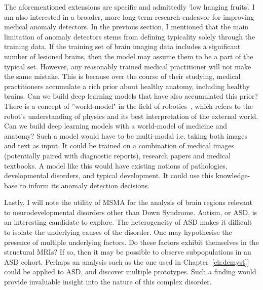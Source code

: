 The aforementioned extensions are specific and admittedly 'low hanging fruits'.  I am also interested in a broader, more long-term research endeavor for improving medical anomaly detectors. In the previous section, I mentioned that the main limitation of anomaly detectors stems from defining typicality solely through the training data. If the training set of brain imaging data includes a significant number of lesioned brains, then the model may assume them to be a part of the typical set. However, any reasonably trained medical practitioner will not make the same mistake. This is because over the course of their studying, medical practitioners accumulate a rich prior about healthy anatomy, including healthy brains. Can we build deep learning models that have also accumulated this prior? There is a concept of ''world-model" in the field of robotics~\cite{ha2018world}, which refers to the robot's understanding of physics and its best interpretation of the external world. Can we build deep learning models with a world-model of medicine and anatomy?  Such a model would have to be multi-modal i.e. taking both images and text as input. It could be trained on a combination of medical images (potentially paired with diagnostic reports), research papers and medical textbooks. A model like this would have existing notions of pathologies, developmental disorders, and typical development. It could use this knowledge-base to inform its anomaly detection decisions.

Lastly, I will note the utility of MSMA for the analysis of brain regions relevant to neurodevelopmental disorders other than Down Syndrome. Autism, or ASD, is an interesting candidate to explore. The heterogeneity of ASD makes it difficult to isolate the underlying causes of the disorder. One may hypothesise the presence of multiple underlying factors. Do these factors exhibit themselves in the structural MRIs? If so, then it may be possible to observe subpopulations in an ASD cohort. Perhaps an analysis such as the one used in Chapter~\ref{ch:demyst}] could be applied to ASD, and discover multiple prototypes. Such a finding would provide invaluable insight into the nature of this complex disorder.